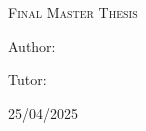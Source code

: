 \begin{titlepage}
    \centering
    \vspace{1cm}
    {\bfseries\LARGE \institution \par}
    \vspace{1cm}
    {\scshape\Large Final Master Thesis \par}
    \vspace{3cm}
    {\scshape\Huge \projecttitle \par}
    \vspace{2cm}
    \vfill
    {\Large Author: \par}
    {\Large \authorname \par}
    \vspace{1cm}
    {\Large Tutor: \par}
    {\Large \tutorname \par}
    \vfill
    {\Large 25/04/2025 \par}
\end{titlepage}
